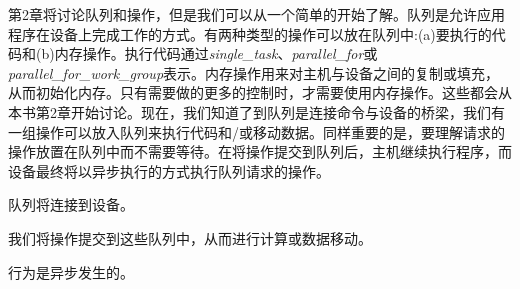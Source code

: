 第2章将讨论队列和操作，但是我们可以从一个简单的开始了解。队列是允许应用程序在设备上完成工作的方式。有两种类型的操作可以放在队列中:(a)要执行的代码和(b)内存操作。执行代码通过\textit{single\_task}、\textit{parallel\_for}或\textit{parallel\_for\_work\_group}表示。内存操作用来对主机与设备之间的复制或填充，从而初始化内存。只有需要做的更多的控制时，才需要使用内存操作。这些都会从本书第2章开始讨论。现在，我们知道了到队列是连接命令与设备的桥梁，我们有一组操作可以放入队列来执行代码和/或移动数据。同样重要的是，要理解请求的操作放置在队列中而不需要等待。在将操作提交到队列后，主机继续执行程序，而设备最终将以异步执行的方式执行队列请求的操作。\par

\begin{tcolorbox}[colback=red!5!white,colframe=red!75!black]
队列将连接到设备。\par
我们将操作提交到这些队列中，从而进行计算或数据移动。\par
行为是异步发生的。\par
\end{tcolorbox}